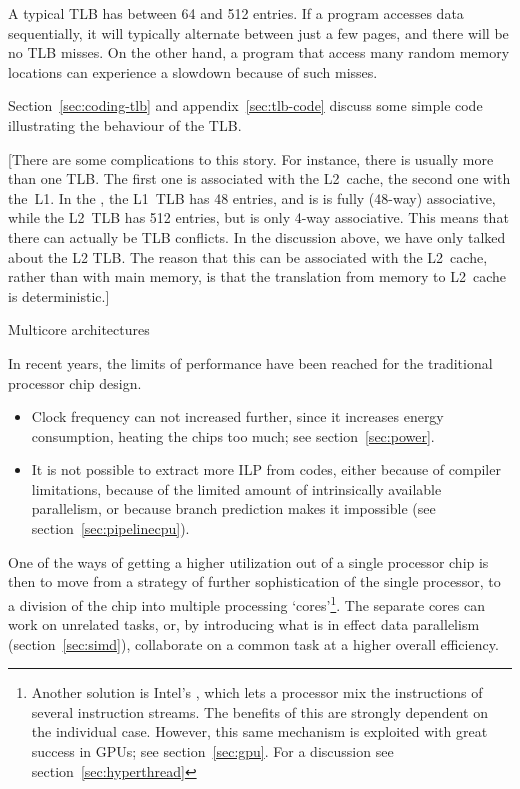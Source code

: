 A typical \ac{TLB} has between 64 and 512 entries. If a program accesses
data sequentially, it will typically alternate between just a few
pages, and there will be no \ac{TLB} misses. On the other hand, a program
that access many random memory locations can experience a slowdown
because of such misses. 

Section~\ref{sec:coding-tlb} and appendix~\ref{sec:tlb-code} discuss
some simple code illustrating the
behaviour of the \ac{TLB}.

[There are some complications to this story. For instance, there is
  usually more than one \ac{TLB}. The first one is associated with the
  L2~cache, the second one with the~L1. In the
  , the L1~\ac{TLB} has 48 entries, and
  is is fully (48-way) associative, while the L2~\ac{TLB} has 512
  entries, but is only 4-way associative. This means that there can
  actually be \ac{TLB} conflicts. In the discussion above, we have
  only talked about the L2 \ac{TLB}. The reason that this can be
  associated with the L2~cache, rather than with main memory, is that
  the translation from memory to L2~cache is deterministic.]

 {Multicore architectures}
\label{sec:multicore}

In recent years, the limits of performance have been reached for the
traditional processor chip design.
\begin{itemize}
\item Clock frequency can not increased further, since it increases
  energy consumption, heating the chips too
  much; see section~\ref{sec:power}. 
\item It is not possible to extract more \acf{ILP}
  from codes, either because of compiler limitations, because of the
  limited amount of intrinsically available parallelism, or because
  branch prediction makes it impossible (see
  section~\ref{sec:pipelinecpu}).
\end{itemize}

One of the ways of getting a higher utilization out of a single
processor chip is then to move from a strategy of further
sophistication of the single processor, to a division of the chip into
multiple processing `cores'\footnote{Another solution is Intel's
  , which lets a processor mix the instructions of
  several instruction streams. The benefits of this are strongly
  dependent on the individual case. However, this same mechanism is
  exploited with great success in GPUs; see
  section~\ref{sec:gpu}. For a discussion see section~\ref{sec:hyperthread}}.
The separate cores can work on unrelated
tasks, or, by introducing what is in effect data parallelism
(section~\ref{sec:simd}), collaborate on a common task at a higher
overall efficiency.

